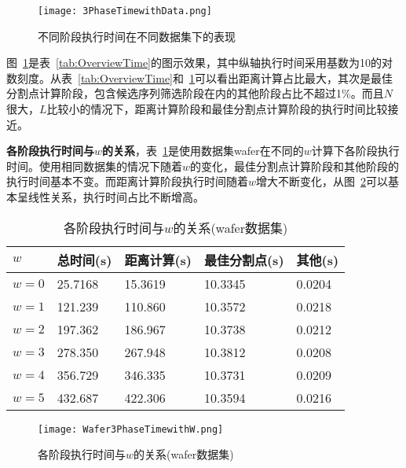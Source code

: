 \begin{figure}[H] %
	\centering
	\texttt{[image: 3PhaseTimewithData.png]}
	\caption{不同阶段执行时间在不同数据集下的表现}
	\label{fig:3PhaseTimewithData}
\end{figure}

图~\ref{fig:3PhaseTimewithData}是表~\ref{tab:OverviewTime}的图示效果，其中纵轴执行时间采用基数为10的对数刻度。从表~\ref{tab:OverviewTime}和~\ref{fig:3PhaseTimewithData}可以看出距离计算占比最大，其次是最佳分割点计算阶段，包含候选序列筛选阶段在内的其他阶段占比不超过1\%。而且$N$很大，$L$比较小的情况下，距离计算阶段和最佳分割点计算阶段的执行时间比较接近。

\textbf{各阶段执行时间与$w$的关系}，表~\ref{tab:Timewithw}是使用数据集wafer在不同的$w$计算下各阶段执行时间。使用相同数据集的情况下随着$w$的变化，最佳分割点计算阶段和其他阶段的执行时间基本不变。而距离计算阶段执行时间随着$w$增大不断变化，从图~\ref{fig:Wafer3PhaseTimewithW}可以基本呈线性关系，执行时间占比不断增高。

\begin{table}[htbp]
	\centering
	\begin{minipage}{0.9\textwidth}
		\caption{各阶段执行时间与$w$的关系(wafer数据集)}
		\label{tab:Timewithw}
		\begin{tabular}{p{2cm}p{2cm}p{2cm}p{3cm}p{2cm}}
			\toprule[1.5pt]
			 {\heiti $w$ } &{\heiti 总时间(s) } &{\heiti 距离计算(s) } &{\heiti 最佳分割点(s) } &{\heiti 其他(s) }
			\\\midrule[1pt]			
			$w=0$ & 25.7168 & 15.3619 & 10.3345 & 0.0204\\
			$w=1$ & 121.239 & 110.860 & 10.3572 & 0.0218\\
			$w=2$ & 197.362 & 186.967 & 10.3738 & 0.0212\\
			$w=3$ & 278.350 & 267.948 & 10.3812 & 0.0208\\
			$w=4$ & 356.729 & 346.335 & 10.3731 & 0.0209\\
			$w=5$ & 432.687 & 422.306 & 10.3594 & 0.0216\\
			\bottomrule[1.5pt]
		\end{tabular}
	\end{minipage}
\end{table}

\begin{figure}[H] %
	\centering
	\texttt{[image: Wafer3PhaseTimewithW.png]}
	\caption{各阶段执行时间与$w$的关系(wafer数据集)}
	\label{fig:Wafer3PhaseTimewithW}
\end{figure}

